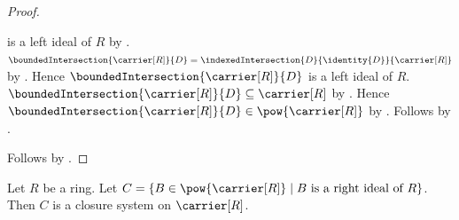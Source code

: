 \begin{proof}
\begin{subproof}
            is a left ideal of $R$ by
            .
        $\boundedIntersection{\carrier[R]}{D}
            =\indexedIntersection{D}{\identity{D}}{\carrier[R]}$ by
            .
        Hence $\boundedIntersection{\carrier[R]}{D}$ is a left ideal of
            $R$.
        $\boundedIntersection{\carrier[R]}{D}
            \subseteq\carrier[R]$ by
            .
        Hence $\boundedIntersection{\carrier[R]}{D}
            \in\pow{\carrier[R]}$ by .
        Follows by \auto.
    \end{subproof}
    Follows by .
\end{proof}

\begin{proposition}\label{right_ideal_carriers_form_closure_system}
    Let $R$ be a ring.
    Let
        $C=\{B\in\pow{\carrier[R]}\mid
            \text{$B$ is a right ideal of $R$}\}$.
    Then $C$ is a closure system on $\carrier[R]$.
\end{proposition}
